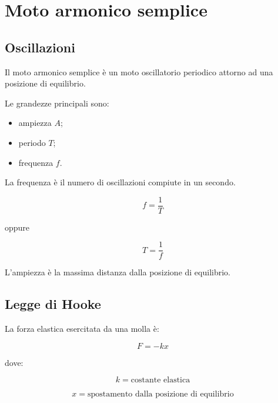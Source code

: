 \vspace{0.5cm}

\section{Moto armonico semplice}

\subsection{Oscillazioni}

\noindent Il moto armonico semplice è un moto oscillatorio periodico attorno ad una posizione di equilibrio.

\vspace{0.3cm}

\noindent Le grandezze principali sono:

\begin{itemize}
\item ampiezza $A$;
\item periodo $T$;
\item frequenza $f$.
\end{itemize}

\vspace{0.3cm}

\noindent La frequenza è il numero di oscillazioni compiute in un secondo.

\[
f=\frac{1}{T}
\]

\noindent oppure

\[
T=\frac{1}{f}
\]

\vspace{0.3cm}

\noindent L'ampiezza è la massima distanza dalla posizione di equilibrio.

\vspace{0.5cm}

\subsection{Legge di Hooke}

\noindent La forza elastica esercitata da una molla è:

\[
F=-kx
\]

\noindent dove:

\[
k=\text{costante elastica}
\]

\[
x=\text{spostamento dalla posizione di equilibrio}
\]

\vspace{0.3cm}

